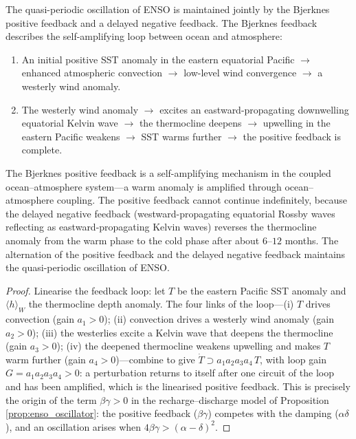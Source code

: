 \begin{proposition}\label{prop:bjerknes_feedback}
The quasi-periodic oscillation of ENSO is maintained jointly by the Bjerknes positive feedback and a delayed negative feedback. The Bjerknes feedback describes the self-amplifying loop between ocean and atmosphere:
\begin{enumerate}[label=(\roman*)]
    \item An initial positive SST anomaly in the eastern equatorial Pacific $\to$ enhanced atmospheric convection $\to$ low-level wind convergence $\to$ a westerly wind anomaly.
    \item The westerly wind anomaly $\to$ excites an eastward-propagating downwelling equatorial Kelvin wave $\to$ the thermocline deepens $\to$ upwelling in the eastern Pacific weakens $\to$ SST warms further $\to$ the positive feedback is complete.
\end{enumerate}
The Bjerknes positive feedback is a self-amplifying mechanism in the coupled ocean--atmosphere system---a warm anomaly is amplified through ocean--atmosphere coupling. The positive feedback cannot continue indefinitely, because the delayed negative feedback (westward-propagating equatorial Rossby waves reflecting as eastward-propagating Kelvin waves) reverses the thermocline anomaly from the warm phase to the cold phase after about $6$--$12$ months. The alternation of the positive feedback and the delayed negative feedback maintains the quasi-periodic oscillation of ENSO.
\end{proposition}

\begin{proof}
Linearise the feedback loop: let $T$ be the eastern Pacific SST anomaly and $\langle h\rangle_W$ the thermocline depth anomaly. The four links of the loop---(i) $T$ drives convection (gain $a_1>0$); (ii) convection drives a westerly wind anomaly (gain $a_2>0$); (iii) the westerlies excite a Kelvin wave that deepens the thermocline (gain $a_3>0$); (iv) the deepened thermocline weakens upwelling and makes $T$ warm further (gain $a_4>0$)---combine to give $\dot T \supset a_1 a_2 a_3 a_4 \, T$, with loop gain $G = a_1a_2a_3a_4 > 0$: a perturbation returns to itself after one circuit of the loop and has been amplified, which is the linearised positive feedback. This is precisely the origin of the term $\beta\gamma > 0$ in the recharge--discharge model of Proposition \ref{prop:enso_oscillator}: the positive feedback ($\beta\gamma$) competes with the damping ($\alpha\delta$), and an oscillation arises when $4\beta\gamma > (\alpha-\delta)^2$.
\end{proof}

